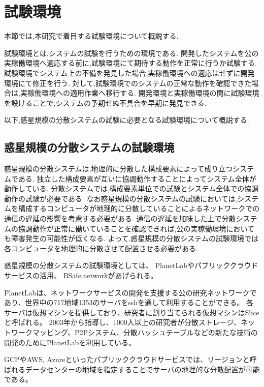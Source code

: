 \section{試験環境}
\label{bg:staging}

本節では,本研究で着目する試験環境について概説する.

試験環境とは,システムの試験を行うための環境である.
開発したシステムを公の実稼働環境へ適応する前に,試験環境にて期待する動作を正常に行うか試験する.
試験環境でシステム上の不備を発見した場合,実稼働環境への適応はせずに開発環境にて修正を行う.
対して,試験環境でのシステムの正常な動作を確認できた場合は,実稼働環境への適用作業へ移行する.
開発環境と実稼働環境の間に試験環境を設けることで,システムの予期せぬ不具合を早期に発見できる.

以下,惑星規模の分散システムの試験に必要となる試験環境について概説する.

\subsection{惑星規模の分散システムの試験環境}
\label{bg:staging:planetary-scale-distributed-system}

惑星規模の分散システムは,地理的に分散した構成要素によって成り立つシステムである.
独立した構成要素が互いに協調動作することによってシステム全体が動作している.
分散システムでは,構成要素単位での試験とシステム全体での協調動作の試験が必要である.
なお惑星規模の分散システムの試験においては,システムを構成するコンピュータが地理的に分散していることによるネットワークでの通信の遅延の影響を考慮する必要がある.
通信の遅延を加味した上で分散システムの協調動作が正常に働いていることを確認できれば,公の実稼働環境においても障害発生の可能性が低くなる.
よって,惑星規模の分散システムの試験環境では各コンピュータを地理的に分散させて配置させる必要がある.

惑星規模の分散システムの試験環境としては、 PlanetLabやパブリッククラウドサービスの活用、 BSafe.networkがあげられる。

PlanetLabは、ネットワークサービスの開発を支援する公の研究ネットワークであり、世界中の717地域1353のサーバをsshを通して利用することができる。
各サーバは仮想マシンを提供しており、研究者に割り当てられる仮想マシンはSliceと呼ばれる。
2003年から指導し、1000人以上の研究者が分散ストレージ、ネットワークマッピング、P2Pシステム、分散ハッシュテーブルなどの新たな技術の開発のためにPlanetLabを利用している。

GCPやAWS, Azureといったパブリッククラウドサービスでは、リージョンと呼ばれるデータセンターの地域を指定することでサーバの地理的な分散配置が可能である。


